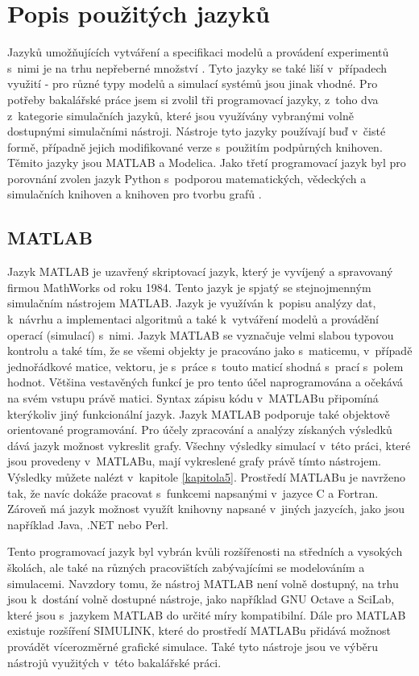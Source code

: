 \section{Popis použitých jazyků}
Jazyků umožňujících vytváření a specifikaci modelů a provádení experimentů s~nimi je na trhu nepřeberné množství \cite{list-of-process-modelling-lang}. Tyto jazyky se také liší v~případech využití - pro různé typy modelů a simulací systémů jsou jinak vhodné. Pro potřeby bakalářské práce jsem si zvolil tři programovací jazyky, z~toho dva z~kategorie simulačních jazyků, které jsou využívány vybranými volně dostupnými simulačními nástroji. Nástroje tyto jazyky používají buď v~čisté formě, případně jejich modifikované verze s~použitím podpůrných knihoven. Těmito jazyky jsou MATLAB\cite{MATLAB:2010} a Modelica\cite{Fritzson02modelica--}. Jako třetí programovací jazyk byl pro porovnání zvolen jazyk Python s~podporou matematických, vědeckých a simulačních knihoven a knihoven pro tvorbu grafů \cite{scipy}. 

\subsection{MATLAB}
\label{matlab-lang}
Jazyk MATLAB je uzavřený skriptovací jazyk, který je vyvíjený a spravovaný firmou MathWorks od roku 1984. Tento jazyk je spjatý se stejnojmenným simulačním nástrojem MATLAB. Jazyk je využíván k~popisu analýzy dat, k~návrhu a implementaci algoritmů a také k~vytváření modelů a provádění operací (simulací) s~nimi. Jazyk MATLAB se vyznačuje velmi slabou typovou kontrolu a také tím, že se všemi objekty je pracováno jako s~maticemu, v~případě jednořádkové matice, vektoru, je s~práce s~touto maticí shodná s~prací s~polem hodnot. Většina vestavěných funkcí je pro tento účel naprogramována a očekává na svém vstupu právě matici. Syntax zápisu kódu v~MATLABu připomíná kterýkoliv jiný funkcionální jazyk. Jazyk MATLAB podporuje také objektově orientované programování. Pro účely zpracování a analýzy získaných výsledků dává jazyk možnost vykreslit grafy. Všechny výsledky simulací v~této práci, které jsou provedeny v~MATLABu, mají vykreslené grafy právě tímto nástrojem. Výsledky můžete nalézt v~kapitole \ref{kapitola5}. Prostředí MATLABu je navrženo tak, že navíc dokáže pracovat s~funkcemi napsanými v~jazyce C a Fortran. Zároveň má jazyk možnost využít knihovny napsané v~jiných jazycích, jako jsou například Java, .NET nebo Perl.

Tento programovací jazyk byl vybrán kvůli rozšířenosti na středních a vysokých školách, ale také na různých pracovištích zabývajícími se modelováním a simulacemi. Navzdory tomu, že nástroj MATLAB není volně dostupný, na trhu jsou k~dostání volně dostupné nástroje, jako například GNU Octave a SciLab, které jsou s~jazykem MATLAB do určité míry kompatibilní. Dále pro MATLAB existuje rozšíření SIMULINK, které do prostředí MATLABu přidává možnost provádět vícerozměrné grafické simulace. Také tyto nástroje jsou ve výběru nástrojů využitých v~této bakalářské práci.

